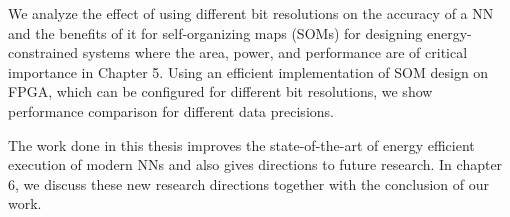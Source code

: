 We analyze the effect of using different bit resolutions on the accuracy of a NN and the benefits of it for self-organizing maps (SOMs) for designing energy-constrained systems where the area, power, and performance are of critical importance in Chapter 5. Using an efficient implementation of SOM design on FPGA, which can be configured for different bit resolutions, we show performance comparison for different data precisions. 

The work done in this thesis improves the state-of-the-art of energy efficient execution of modern NNs and also gives directions to future research. In chapter 6, we discuss these new research directions together with the conclusion of our work.